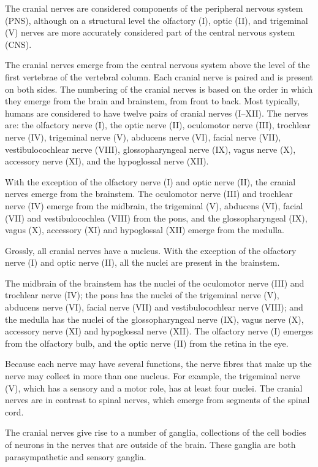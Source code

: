 \documentclass[]{book}
\begin{document}
The cranial nerves are considered components of the peripheral nervous system (PNS), although on a structural level the olfactory (I), optic (II), and trigeminal (V) nerves are more accurately considered part of the central nervous system (CNS).

The cranial nerves emerge from the central nervous system above the level of the first vertebrae of the vertebral column. Each cranial nerve is paired and is present on both sides. The numbering of the cranial nerves is based on the order in which they emerge from the brain and brainstem, from front to back. Most typically, humans are considered to have twelve pairs of cranial nerves (I--XII). The nerves are: the olfactory nerve (I), the optic nerve (II), oculomotor nerve (III), trochlear nerve (IV), trigeminal nerve (V), abducens nerve (VI), facial nerve (VII), vestibulocochlear nerve (VIII), glossopharyngeal nerve (IX), vagus nerve (X), accessory nerve (XI), and the hypoglossal nerve (XII).

With the exception of the olfactory nerve (I) and optic nerve (II), the cranial nerves emerge from the brainstem. The oculomotor nerve (III) and trochlear nerve (IV) emerge from the midbrain, the trigeminal (V), abducens (VI), facial (VII) and vestibulocochlea (VIII) from the pons, and the glossopharyngeal (IX), vagus (X), accessory (XI) and hypoglossal (XII) emerge from the medulla.

Grossly, all cranial nerves have a nucleus. With the exception of the olfactory nerve (I) and optic nerve (II), all the nuclei are present in the brainstem.

The midbrain of the brainstem has the nuclei of the oculomotor nerve (III) and trochlear nerve (IV); the pons has the nuclei of the trigeminal nerve (V), abducens nerve (VI), facial nerve (VII) and vestibulocochlear nerve (VIII); and the medulla has the nuclei of the glossopharyngeal nerve (IX), vagus nerve (X), accessory nerve (XI) and hypoglossal nerve (XII). The olfactory nerve (I) emerges from the olfactory bulb, and the optic nerve (II) from the retina in the eye.

Because each nerve may have several functions, the nerve fibres that make up the nerve may collect in more than one nucleus. For example, the trigeminal nerve (V), which has a sensory and a motor role, has at least four nuclei.
The cranial nerves are in contrast to spinal nerves, which emerge from segments of the spinal cord.

The cranial nerves give rise to a number of ganglia, collections of the cell bodies of neurons in the nerves that are outside of the brain. These ganglia are both parasympathetic and sensory ganglia.
\end{document}
